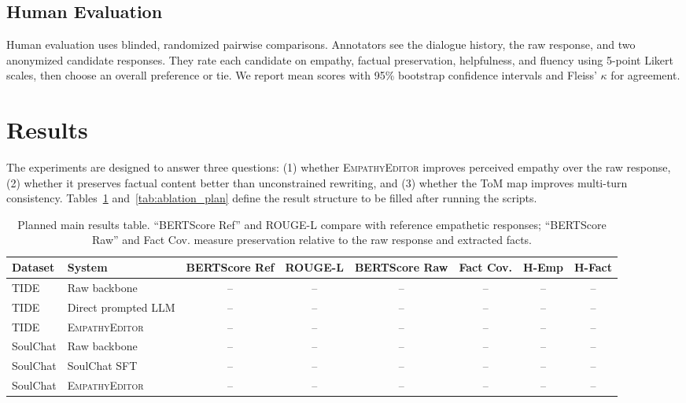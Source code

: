 \documentclass[11pt]{article}
\begin{document}
\subsection{Human Evaluation}

Human evaluation uses blinded, randomized pairwise comparisons. Annotators see the dialogue history, the raw response, and two anonymized candidate responses. They rate each candidate on empathy, factual preservation, helpfulness, and fluency using 5-point Likert scales, then choose an overall preference or tie. We report mean scores with 95\% bootstrap confidence intervals and Fleiss' $\kappa$ for agreement.

\section{Results}
\label{sec:results}

The experiments are designed to answer three questions: (1) whether \textsc{EmpathyEditor} improves perceived empathy over the raw response, (2) whether it preserves factual content better than unconstrained rewriting, and (3) whether the ToM map improves multi-turn consistency. Tables~\ref{tab:main_results_plan} and~\ref{tab:ablation_plan} define the result structure to be filled after running the scripts.

\begin{table}[t]
\centering
\small
\begin{tabular}{llcccccc}
\toprule
\textbf{Dataset} & \textbf{System} & \textbf{BERTScore Ref} & \textbf{ROUGE-L} & \textbf{BERTScore Raw} & \textbf{Fact Cov.} & \textbf{H-Emp} & \textbf{H-Fact} \\
\midrule
TIDE & Raw backbone & -- & -- & -- & -- & -- & -- \\
TIDE & Direct prompted LLM & -- & -- & -- & -- & -- & -- \\
TIDE & \textsc{EmpathyEditor} & -- & -- & -- & -- & -- & -- \\
\midrule
SoulChat & Raw backbone & -- & -- & -- & -- & -- & -- \\
SoulChat & SoulChat SFT & -- & -- & -- & -- & -- & -- \\
SoulChat & \textsc{EmpathyEditor} & -- & -- & -- & -- & -- & -- \\
\bottomrule
\end{tabular}
\caption{Planned main results table. ``BERTScore Ref'' and ROUGE-L compare with reference empathetic responses; ``BERTScore Raw'' and Fact Cov. measure preservation relative to the raw response and extracted facts.}
\label{tab:main_results_plan}
\end{table}
\end{document}
